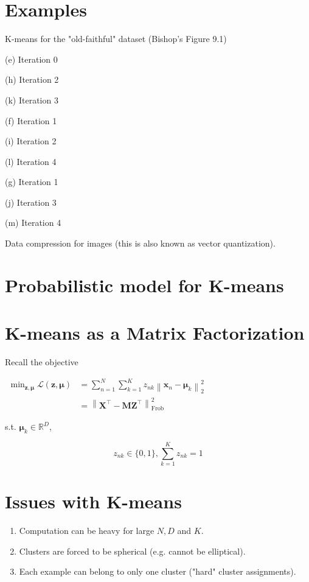 \section*{Examples}
K-means for the "old-faithful" dataset (Bishop's Figure 9.1)



(e) Iteration 0



(h) Iteration 2



(k) Iteration 3



(f) Iteration 1



(i) Iteration 2



(l) Iteration 4



(g) Iteration 1



(j) Iteration 3



(m) Iteration 4

Data compression for images (this is also known as vector quantization).

\section*{Probabilistic model for K-means}
\section*{K-means as a Matrix Factorization}
Recall the objective

$\begin{aligned} \min _{\mathbf{z}, \boldsymbol{\mu}} \mathcal{L}(\mathbf{z}, \boldsymbol{\mu}) & =\sum_{n=1}^{N} \sum_{k=1}^{K} z_{n k}\left\|\mathbf{x}_{n}-\boldsymbol{\mu}_{k}\right\|_{2}^{2} \\ & =\left\|\mathbf{X}^{\top}-\mathbf{M} \mathbf{Z}^{\top}\right\|_{\text {Frob }}^{2}\end{aligned}$

s.t. $\boldsymbol{\mu}_{k} \in \mathbb{R}^{D}$,

$$
z_{n k} \in\{0,1\}, \sum_{k=1}^{K} z_{n k}=1
$$

\section*{Issues with K-means}
\begin{enumerate}
  \item Computation can be heavy for large $N, D$ and $K$.

  \item Clusters are forced to be spherical (e.g. cannot be elliptical).

  \item Each example can belong to only one cluster ("hard" cluster assignments).

\end{enumerate}